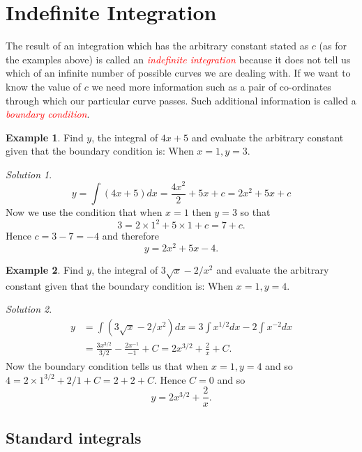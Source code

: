 \documentclass[
  11pt,
  oneside]{book}
\newcommand{\slide}{}
\theoremstyle{definition}
\theoremstyle{definition}
\newtheorem{example}{Example}[chapter]
\theoremstyle{definition}
\theoremstyle{definition}
\theoremstyle{remark}
\newtheorem*{solution}{Solution}
\begin{document}
\slide

\section{Indefinite Integration}\label{indefinite-integration}

The result of an integration which has the arbitrary constant stated as \(c\) (as for the examples above) is called an \textcolor{red}{\em indefinite integration} because it does not tell us which of an infinite number of possible curves we are dealing with. If we want to know the value of \(c\) we need more information such as a pair of co-ordinates through which our particular curve passes. Such additional information is called a \textcolor{red}{\em boundary condition}.

\slide

\begin{example}
Find \(y\), the integral of \(4x + 5\) and evaluate the arbitrary constant given that the boundary condition is: When \(x = 1, y = 3\).
\end{example}

\begin{solution}
\[
y = \int(4x+5)dx = \frac{4x^2}{2} + 5x+c = 2x^2+5x+c
\]
Now we use the condition that when \(x=1\) then \(y=3\) so that
\[
3 = 2\times 1^2 + 5\times1 + c = 7+c.
\]
Hence \(c = 3-7=-4\) and therefore
\[
y = 2x^2+5x-4.
\]
\end{solution}

\slide

\begin{example}
Find \(y\), the integral of \(3\sqrt{x} - 2/x^2\) and evaluate the arbitrary constant given that the boundary condition is: When \(x = 1, y = 4\).
\end{example}

\begin{solution}
\begin{align*}
y& = \int(3\sqrt{x}-2/x^2)dx = 3\int x^{1/2}dx - 2\int x^{-2}dx\\
&= \frac{3x^{3/2}}{3/2} - \frac{2x^{-1}}{-1}+C = 2x^{3/2}+\frac2x+C.
\end{align*}
Now the boundary condition tells us that when \(x=1, y = 4\) and so \(4=2\times1^{3/2}+2/1+C = 2+2+C\). Hence \(C=0\) and so
\[
y = 2x^{3/2}+\frac 2x.
\]
\end{solution}

\slide

\subsection{Standard integrals}\label{standard-integrals}
\end{document}
